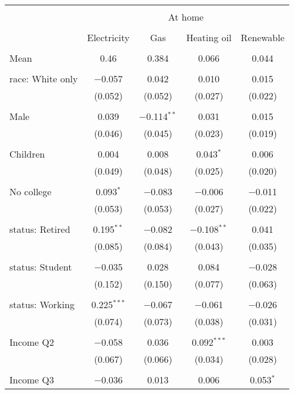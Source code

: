 
\begin{tabular}{@{\extracolsep{5pt}}lcccc} 
\\[-1.8ex]\hline 
\hline \\[-1.8ex] 
 & \multicolumn{4}{c}{At home} \\ 
\cline{2-5} 
\\[-1.8ex] & Electricity & Gas & Heating oil & Renewable \\ 
\hline \\[-1.8ex] 
 Mean & 0.46 & 0.384 & 0.066 & 0.044  \\ \hline \\[-1.8ex] race: White only & $-$0.057 & 0.042 & 0.010 & 0.015 \\ 
  & (0.052) & (0.052) & (0.027) & (0.022) \\ 
  & & & & \\ 
 Male & 0.039 & $-$0.114$^{**}$ & 0.031 & 0.015 \\ 
  & (0.046) & (0.045) & (0.023) & (0.019) \\ 
  & & & & \\ 
 Children & 0.004 & 0.008 & 0.043$^{*}$ & 0.006 \\ 
  & (0.049) & (0.048) & (0.025) & (0.020) \\ 
  & & & & \\ 
 No college & 0.093$^{*}$ & $-$0.083 & $-$0.006 & $-$0.011 \\ 
  & (0.053) & (0.053) & (0.027) & (0.022) \\ 
  & & & & \\ 
 status: Retired & 0.195$^{**}$ & $-$0.082 & $-$0.108$^{**}$ & 0.041 \\ 
  & (0.085) & (0.084) & (0.043) & (0.035) \\ 
  & & & & \\ 
 status: Student & $-$0.035 & 0.028 & 0.084 & $-$0.028 \\ 
  & (0.152) & (0.150) & (0.077) & (0.063) \\ 
  & & & & \\ 
 status: Working & 0.225$^{***}$ & $-$0.067 & $-$0.061 & $-$0.026 \\ 
  & (0.074) & (0.073) & (0.038) & (0.031) \\ 
  & & & & \\ 
 Income Q2 & $-$0.058 & 0.036 & 0.092$^{***}$ & 0.003 \\ 
  & (0.067) & (0.066) & (0.034) & (0.028) \\ 
  & & & & \\ 
 Income Q3 & $-$0.036 & 0.013 & 0.006 & 0.053$^{*}$ \\ 

\end{tabular}
